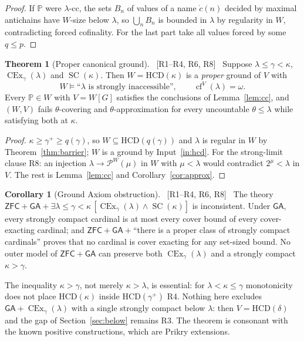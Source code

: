 \documentclass[11pt,letterpaper]{article}
\theoremstyle{definition}
\newtheorem{theorem}[definition]{Theorem}
\newtheorem{corollary}[definition]{Corollary}
\numberwithin{equation}{section}
\newcommand{\ZFC}{\mathsf{ZFC}}
\newcommand{\GA}{\mathsf{GA}}
\newcommand{\HCD}{\mathrm{HCD}}
\newcommand{\SC}{\operatorname{SC}}
\newcommand{\CEx}{\operatorname{CEx}}
\newcommand{\cf}{\operatorname{cf}}
\newcommand{\Pow}{\mathcal P}
\newcommand{\PP}{\mathbb P}
\newcommand{\src}[1]{\unskip\ {\normalfont\small\sffamily\color{Olive}[#1]}\ }
\newcommand{\R}[1]{\textsf{R#1}}
\begin{document}
\begin{proof}
If $\PP$ were $\lambda$-cc, the sets $B_n$ of values of a name $\dot c(n)$ decided by maximal antichains have $W$-size below $\lambda$, so $\bigcup_nB_n$ is bounded in $\lambda$ by regularity in $W$, contradicting forced cofinality. For the last part take all values forced by some $q\le p$.
\end{proof}

\begin{theorem}[Proper canonical ground]\label{thm:ground}\src{R1--R4, R6, R8}
Suppose $\lambda\le\gamma<\kappa$, $\CEx_\gamma(\lambda)$ and $\SC(\kappa)$. Then $W=\HCD(\kappa)$ is a \emph{proper} ground of $V$ with
\[
W\models\text{``$\lambda$ is strongly inaccessible''},\qquad\cf^V(\lambda)=\omega.
\]
Every $\PP\in W$ with $V=W[G]$ satisfies the conclusions of Lemma~\ref{lem:cc}, and $(W,V)$ fails $\theta$-covering and $\theta$-approximation for every uncountable $\theta\le\lambda$ while satisfying both at $\kappa$.
\end{theorem}

\begin{proof}
$\kappa\ge\gamma^+\ge q(\gamma)$, so $W\subseteq\HCD(q(\gamma))$ and $\lambda$ is regular in $W$ by Theorem~\ref{thm:barrier}; $W$ is a ground by Input~\ref{in:hcd}. For the strong-limit clause \R8: an injection $\lambda\to\Pow^W(\mu)$ in $W$ with $\mu<\lambda$ would contradict $2^\mu<\lambda$ in $V$. The rest is Lemma~\ref{lem:cc} and Corollary~\ref{cor:approx}.
\end{proof}

\begin{corollary}[Ground Axiom obstruction]\label{cor:ga}\src{R1--R4, R6, R8}
The theory $\ZFC+\GA+\exists\lambda\le\gamma<\kappa\,[\CEx_\gamma(\lambda)\wedge\SC(\kappa)]$ is inconsistent. Under $\GA$, every strongly compact cardinal is at most every cover bound of every cover-exacting cardinal; and $\ZFC+\GA+{}$``there is a proper class of strongly compact cardinals'' proves that no cardinal is cover exacting for any set-sized bound. No outer model of $\ZFC+\GA$ can preserve both $\CEx_\gamma(\lambda)$ and a strongly compact $\kappa>\gamma$.
\end{corollary}

The inequality $\kappa>\gamma$, not merely $\kappa>\lambda$, is essential: for $\lambda<\kappa\le\gamma$ monotonicity does not place $\HCD(\kappa)$ inside $\HCD(\gamma^+)$ \R4. Nothing here excludes $\GA+\CEx_\gamma(\lambda)$ with a single strongly compact below $\lambda$: then $V=\HCD(\delta)$ and the gap of Section~\ref{sec:below} remains \R3. The theorem is consonant with the known positive constructions, which are Prikry extensions.
\end{document}
